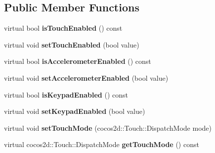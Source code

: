 \subsection*{Public Member Functions}
\begin{DoxyCompactItemize}
\item 
\mbox{\label{classcocostudio_1_1InputDelegate_aa925367ed15043c5b788f4d1d5466e65}} 
virtual bool {\bfseries is\+Touch\+Enabled} () const
\item 
\mbox{\label{classcocostudio_1_1InputDelegate_a38d14c4810ac83fc26bca8c9fa994b4f}} 
virtual void {\bfseries set\+Touch\+Enabled} (bool value)
\item 
\mbox{\label{classcocostudio_1_1InputDelegate_a90e5cdaea0b58c7a0d320c14e14062ad}} 
virtual bool {\bfseries is\+Accelerometer\+Enabled} () const
\item 
\mbox{\label{classcocostudio_1_1InputDelegate_ab620fc62fac1ff81e4189dc85b33db21}} 
virtual void {\bfseries set\+Accelerometer\+Enabled} (bool value)
\item 
\mbox{\label{classcocostudio_1_1InputDelegate_ab2af7789bed18620c1923118a54feaf2}} 
virtual bool {\bfseries is\+Keypad\+Enabled} () const
\item 
\mbox{\label{classcocostudio_1_1InputDelegate_ae9395abde966440815814fc7f215e57c}} 
virtual void {\bfseries set\+Keypad\+Enabled} (bool value)
\item 
\mbox{\label{classcocostudio_1_1InputDelegate_abed939267ce57c38ed6d6c2181fde360}} 
virtual void {\bfseries set\+Touch\+Mode} (cocos2d\+::\+Touch\+::\+Dispatch\+Mode mode)
\item 
\mbox{\label{classcocostudio_1_1InputDelegate_a6851d4bcb5e95ccdf52a24941fcf8884}} 
virtual cocos2d\+::\+Touch\+::\+Dispatch\+Mode {\bfseries get\+Touch\+Mode} () const
\item 
\mbox{\label{classcocostudio_1_1InputDelegate_a20e2bc0f3b9a842532dea0787ce7cbf0}} 

\end{DoxyCompactItemize}
